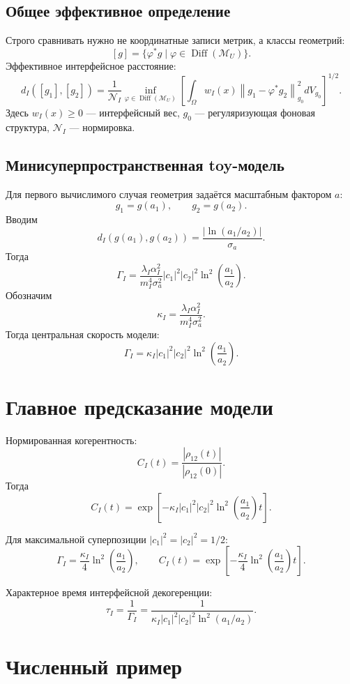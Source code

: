 \documentclass[12pt,a4paper]{article}
\DeclareMathOperator{\Diff}{Diff}
\newcommand{\M}{\mathcal M_U}
\begin{document}
\subsection{Общее эффективное определение}

Строго сравнивать нужно не координатные записи метрик, а классы геометрий:
\[
[g]=\{\varphi^*g\mid \varphi\in\Diff(\M)\}.
\]
Эффективное интерфейсное расстояние:
\[
\boxed{
d_I([g_1],[g_2])
=
\frac{1}{\mathcal N_I}
\inf_{\varphi\in\Diff(\M)}
\left[
\int_\Omega
w_I(x)
\left\|g_1-\varphi^*g_2\right\|_{g_0}^2
 dV_{g_0}
\right]^{1/2}.
}
\]
Здесь \(w_I(x)\geq0\) --- интерфейсный вес, \(g_0\) --- регуляризующая фоновая структура, \(\mathcal N_I\) --- нормировка.

\subsection{Минисуперпространственная toy-модель}

Для первого вычислимого случая геометрия задаётся масштабным фактором \(a\):
\[
g_1=g(a_1),
\qquad
 g_2=g(a_2).
\]
Вводим
\[
\boxed{
d_I(g(a_1),g(a_2))=\frac{|\ln(a_1/a_2)|}{\sigma_a}.
}
\]
Тогда
\[
\Gamma_I
=
\frac{\lambda_I\alpha_I^2}{m_I^4\sigma_a^2}
|c_1|^2|c_2|^2
\ln^2\left(\frac{a_1}{a_2}\right).
\]
Обозначим
\[
\kappa_I=\frac{\lambda_I\alpha_I^2}{m_I^4\sigma_a^2}.
\]
Тогда центральная скорость модели:
\[
\boxed{
\Gamma_I
=
\kappa_I |c_1|^2|c_2|^2
\ln^2\left(\frac{a_1}{a_2}\right).
}
\]

\section{Главное предсказание модели}

Нормированная когерентность:
\[
C_I(t)=\frac{|\rho_{12}(t)|}{|\rho_{12}(0)|}.
\]
Тогда
\[
\boxed{
C_I(t)=
\exp\left[-
\kappa_I |c_1|^2|c_2|^2
\ln^2\left(\frac{a_1}{a_2}\right)t
\right].
}
\]

Для максимальной суперпозиции \(|c_1|^2=|c_2|^2=1/2\):
\[
\boxed{
\Gamma_I=\frac{\kappa_I}{4}\ln^2\left(\frac{a_1}{a_2}\right),
\qquad
C_I(t)=\exp\left[-\frac{\kappa_I}{4}\ln^2\left(\frac{a_1}{a_2}\right)t\right].
}
\]

Характерное время интерфейсной декогеренции:
\[
\boxed{
\tau_I=\frac{1}{\Gamma_I}
=
\frac{1}{\kappa_I |c_1|^2|c_2|^2\ln^2(a_1/a_2)}.
}
\]

\section{Численный пример}
\end{document}
